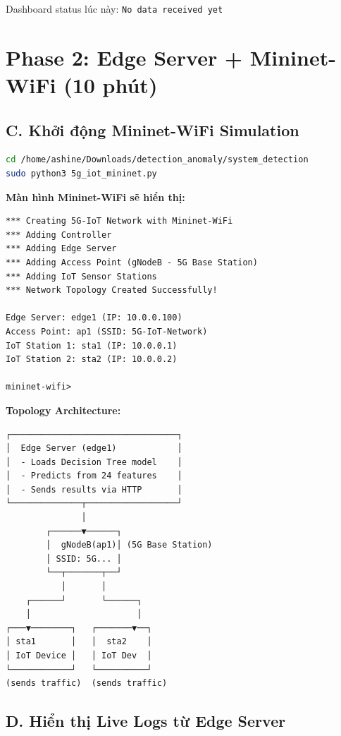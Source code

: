 \documentclass[12pt,a4paper]{article}
\begin{document}
Dashboard status lúc này: \texttt{No data received yet}

\section{Phase 2: Edge Server + Mininet-WiFi (10 phút)}

\subsection{C. Khởi động Mininet-WiFi Simulation}

\begin{lstlisting}[language=bash]
cd /home/ashine/Downloads/detection_anomaly/system_detection
sudo python3 5g_iot_mininet.py
\end{lstlisting}

\textbf{Màn hình Mininet-WiFi sẽ hiển thị:}
\begin{lstlisting}
*** Creating 5G-IoT Network with Mininet-WiFi
*** Adding Controller
*** Adding Edge Server
*** Adding Access Point (gNodeB - 5G Base Station)
*** Adding IoT Sensor Stations
*** Network Topology Created Successfully!

Edge Server: edge1 (IP: 10.0.0.100)
Access Point: ap1 (SSID: 5G-IoT-Network)
IoT Station 1: sta1 (IP: 10.0.0.1)
IoT Station 2: sta2 (IP: 10.0.0.2)

mininet-wifi>
\end{lstlisting}

\textbf{Topology Architecture:}
\begin{verbatim}
┌─────────────────────────────────┐
│  Edge Server (edge1)            │
│  - Loads Decision Tree model    │
│  - Predicts from 24 features    │
│  - Sends results via HTTP       │
└──────────────┬──────────────────┘
               │
        ┌──────▼──────┐
        │  gNodeB(ap1)│ (5G Base Station)
        │ SSID: 5G... │
        └──┬───────┬──┘
           │       │
    ┌──────┘       └──────┐
    │                     │
┌───▼────────┐   ┌───────▼──┐
│ sta1       │   │  sta2    │
│ IoT Device │   │ IoT Dev  │
└────────────┘   └──────────┘
(sends traffic)  (sends traffic)
\end{verbatim}

\subsection{D. Hiển thị Live Logs từ Edge Server}
\end{document}
